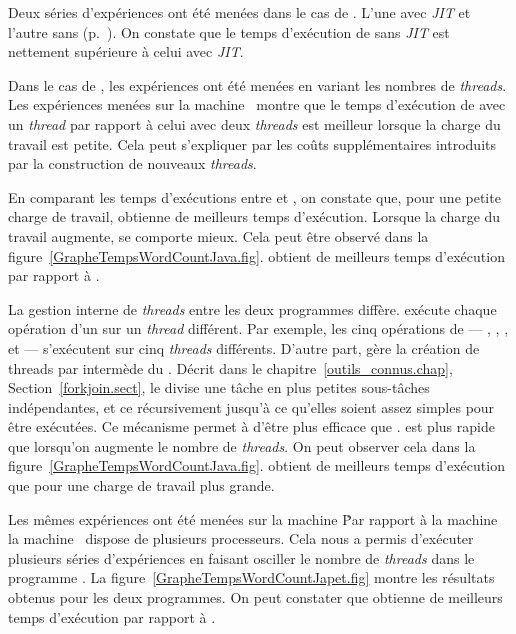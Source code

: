 Deux s\'eries d'exp\'eriences ont \'et\'e men\'ees dans le cas de . L'une avec \emph{JIT} et l'autre sans (p.~\pageref{jitDescription.sect}). On constate que le temps d'ex\'ecution de  sans \emph{JIT} est nettement sup\'erieure \`a celui avec \emph{JIT}.

Dans le cas de , les exp\'eriences ont \'et\'e men\'ees en variant les nombres de \emph{threads}. Les exp\'eriences men\'ees sur la machine \ montre que le temps d'ex\'ecution de  avec un \emph{thread} par rapport \`a celui avec deux \emph{threads} est meilleur lorsque la charge du travail est petite. Cela peut s'expliquer par les co\^uts suppl\'ementaires introduits par la construction de nouveaux \emph{threads}. 

En comparant les temps d'ex\'ecutions entre  et , on constate que, pour une petite charge de travail,  obtienne de meilleurs temps d'ex\'ecution. Lorsque la charge du travail augmente,  se comporte mieux. Cela peut \^etre observ\'e dans la figure~\ref{GrapheTempsWordCountJava.fig}.  obtient de meilleurs temps d'ex\'ecution par rapport \`a . 

La gestion interne de \emph{threads} entre les deux programmes diff\`ere.  ex\'ecute chaque op\'eration d'un  sur un \emph{thread} diff\'erent. Par exemple, les cinq op\'erations de  --- , , ,  et  --- s'ex\'ecutent sur cinq \emph{threads} diff\'erents. D'autre part,  g\`ere la cr\'eation de threads par interm\`ede du . D\'ecrit dans le chapitre~\ref{outils_connus.chap}, Section~\ref{forkjoin.sect}, le  divise une t\^ache en plus petites sous-t\^aches ind\'ependantes, et ce r\'ecursivement jusqu'\`a ce qu'elles soient assez simples pour \^etre ex\'ecut\'ees. Ce m\'ecanisme permet \`a  d'\^etre plus efficace que .  est plus rapide que  lorsqu'on augmente le nombre de \emph{threads}. On peut observer cela dans la figure~\ref{GrapheTempsWordCountJava.fig}.  obtient de meilleurs temps d'ex\'ecution que  pour une charge de travail plus grande.

Les m\^emes exp\'eriences ont \'et\'e men\'ees sur la machine \. Par rapport \`a la machine \, la machine \ dispose de plusieurs processeurs. Cela nous a permis d'ex\'ecuter plusieurs s\'eries d'exp\'eriences en faisant osciller le nombre de \emph{threads} dans le programme . La figure~\ref{GrapheTempsWordCountJapet.fig} montre les r\'esultats obtenus pour les deux programmes. On peut constater que  obtienne de meilleurs temps d'ex\'ecution  par rapport \`a . 




